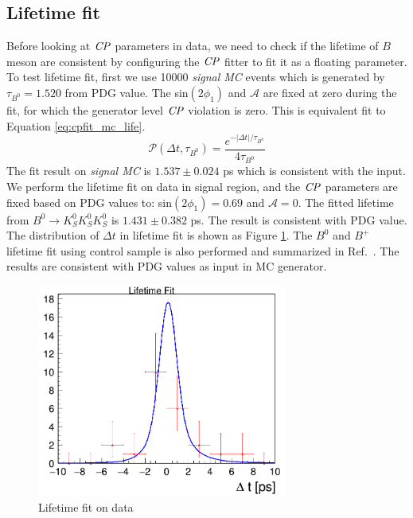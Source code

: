 \subsection{Lifetime fit}
Before looking at $\it{CP}$ parameters in data, we need to check if the lifetime of $B$ meson are consistent by configuring the $\it{CP}$ fitter to fit it as a floating parameter. To test lifetime fit, first we use 10000 \textit{signal MC} events which is generated by $\tau_{B^0} = 1.520$ from PDG value. The sin$(2\phi_1)$ and $\mathcal{A}$ are fixed at zero during the fit, for which the generator level $\it{CP}$ violation is zero. This is equivalent fit to Equation \ref{eq:cpfit_mc_life}.
\begin{equation}\label{eq:cpfit_mc_life}
\mathcal{P}(\Delta t,\tau_{B^0}) = 
\frac{e^{-|\Delta t|/\tau_{B^0}}}{4\tau_{B^0}}
\end{equation}
The fit result on \textit{signal MC} is $1.537 \pm 0.024$ ps which is consistent with the input. We perform the lifetime fit on data in signal region, and the $\it{CP}$ parameters are fixed based on PDG values to: sin$(2\phi_1)=0.69$ and $\mathcal{A} = 0$. The fitted lifetime from $B^0 \to K_S^0  K_S^0  K_S^0$ is $1.431\pm 0.382$ ps. The result is consistent with PDG value. The distribution of $\Delta t$ in lifetime fit is shown as Figure \ref{fig:cpfit_data_life}.
The $B^0$ and $B^+$ lifetime fit using control sample is also performed and summarized in Ref.~\cite{jpsiks_ichep}. The results are consistent with PDG values as input in MC generator. 
\begin{figure}[htpb]
	\centering
	\includegraphics[height=7cm]{figures/lifetime_data}
	\caption{Lifetime fit on data}
	\label{fig:cpfit_data_life}
\end{figure}
